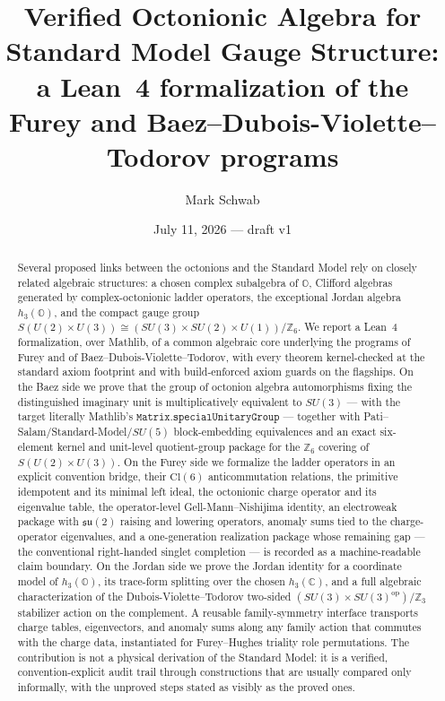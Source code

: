 \documentclass[11pt]{article}
\title{Verified Octonionic Algebra for Standard Model Gauge Structure:\\
a Lean~4 formalization of the Furey and
Baez--Dubois-Violette--Todorov programs}
\author{Mark Schwab}
\date{July 11, 2026 --- draft v1}
\newcommand{\C}{\mathbb{C}}
\newcommand{\OO}{\mathbb{O}}
\newcommand{\su}{\mathfrak{su}}
\newcommand{\leanname}[1]{\texttt{#1}}
\begin{document}
\maketitle

\begin{abstract}
Several proposed links between the octonions and the Standard Model rely on
closely related algebraic structures: a chosen complex subalgebra of
$\OO$, Clifford algebras generated by complex-octonionic ladder operators,
the exceptional Jordan algebra $h_3(\OO)$, and the compact gauge group
$S(U(2)\times U(3)) \cong (SU(3)\times SU(2)\times U(1))/\mathbb{Z}_6$.  We
report a Lean~4 formalization, over Mathlib, of a common algebraic core
underlying the programs of Furey and of
Baez--Dubois-Violette--Todorov, with every theorem kernel-checked at the
standard axiom footprint and with build-enforced axiom guards on the
flagships.  On the Baez side we prove that the group of octonion algebra
automorphisms fixing the distinguished imaginary unit is multiplicatively
equivalent to $SU(3)$ --- with the target literally Mathlib's
$\leanname{Matrix.specialUnitaryGroup}$ --- together with
Pati--Salam/Standard-Model/$SU(5)$ block-embedding equivalences and an
exact six-element kernel and unit-level quotient-group package for the
$\mathbb{Z}_6$ covering of $S(U(2)\times U(3))$.  On the Furey side we
formalize the ladder operators in an explicit convention bridge, their
$\mathrm{Cl}(6)$ anticommutation relations, the primitive idempotent and
its minimal left ideal, the octonionic charge operator and its eigenvalue
table, the operator-level Gell-Mann--Nishijima identity, an electroweak
package with $\su(2)$ raising and lowering operators, anomaly sums tied to
the charge-operator eigenvalues, and a one-generation realization package
whose remaining gap --- the conventional right-handed singlet completion
--- is recorded as a machine-readable claim boundary.  On the Jordan side
we prove the Jordan identity for a coordinate model of $h_3(\OO)$, its
trace-form splitting over the chosen $h_3(\C)$, and a full algebraic
characterization of the Dubois-Violette--Todorov two-sided
$(SU(3)\times SU(3)^{\mathrm{op}})/\mathbb{Z}_3$ stabilizer action on the
complement.  A reusable family-symmetry interface transports charge
tables, eigenvectors, and anomaly sums along any family action that
commutes with the charge data, instantiated for Furey--Hughes triality
role permutations.  The contribution is not a physical derivation of the
Standard Model: it is a verified, convention-explicit audit trail through
constructions that are usually compared only informally, with the
unproved steps stated as visibly as the proved ones.
\end{abstract}
\end{document}
